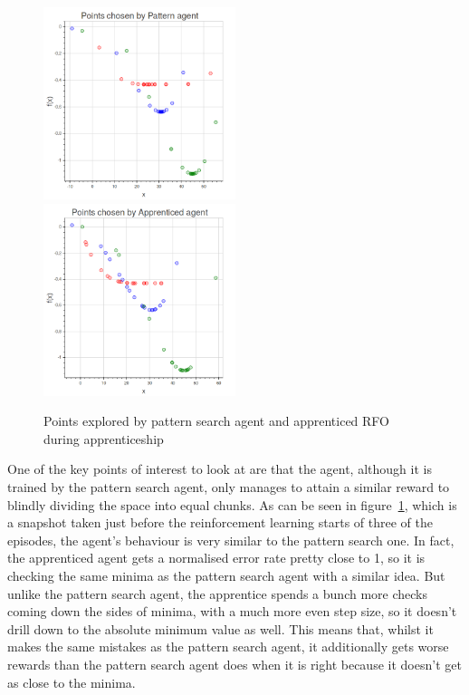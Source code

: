 \begin{figure}
\includegraphics[width = 0.5\textwidth]{pictures/tutorbehav.png} 
\includegraphics[width = 0.5\textwidth]{pictures/pupilbehav.png}
\caption{Points explored by pattern search agent and apprenticed RFO during apprenticeship}
\label{fig:appbehav}
\end{figure}
One of the key points of interest to look at are that the agent, although it is trained by the pattern search agent, only manages to attain a similar reward to blindly dividing the space into equal chunks. As can be seen in figure~\ref{fig:appbehav}, which is a snapshot taken just before the reinforcement learning starts of three of the episodes, the agent's behaviour is very similar to the pattern search one. In fact, the apprenticed agent gets a normalised error rate pretty close to 1, so it is checking the same minima as the pattern search agent with a similar idea. But unlike the pattern search agent, the apprentice spends a bunch more checks coming down the sides of minima, with a much more even step size, so it doesn't drill down to the absolute minimum value as well. This means that, whilst it makes the same mistakes as the pattern search agent, it additionally gets worse rewards than the pattern search agent does when it is right because it doesn't get as close to the minima. 


